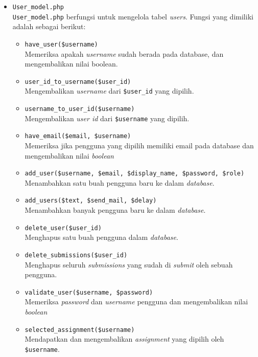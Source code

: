 \begin{itemize}
	\item \verb|User_model.php| \\
	      \verb|User_model.php| berfungsi untuk mengelola tabel \textit{users}. Fungsi yang dimiliki adalah sebagai berikut:

	      \begin{itemize}
		      \item \verb|have_user($username)| \\
					Memeriksa apakah \textit{username} sudah berada pada database, dan mengembalikan nilai boolean.
		      \item \verb|user_id_to_username($user_id)| \\
		            Mengembalikan \textit{username} dari \verb|$user_id| yang dipilih.
		      \item \verb|username_to_user_id($username)| \\
		            Mengembalikan \textit{user id} dari \verb|$username| yang dipilih.
		      \item \verb|have_email($email, $username)| \\
					Memeriksa jika pengguna yang dipilih memiliki email pada database dan mengembalikan nilai \textit{boolean}
		      \item \verb|add_user($username, $email, $display_name, $password, $role)| \\
		            Menambahkan satu buah  pengguna baru ke dalam \textit{database}.
		      \item \verb|add_users($text, $send_mail, $delay)| \\
		            Menambahkan banyak pengguna baru ke dalam \textit{database}.
		      \item \verb|delete_user($user_id)| \\
		            Menghapus satu buah pengguna dalam \textit{database}.
		      \item \verb|delete_submissions($user_id)| \\
		            Menghapus seluruh \textit{submissions} yang sudah di \textit{submit} oleh sebuah pengguna.
		      \item \verb|validate_user($username, $password)| \\
					Memeriksa \textit{password} dan \textit{username} pengguna dan mengembalikan nilai \textit{boolean}
		      \item \verb|selected_assignment($username)| \\
		            Mendapatkan dan mengembalikan \textit{assignment} yang dipilih oleh \verb|$username|.

\end{itemize}
\end{itemize}
